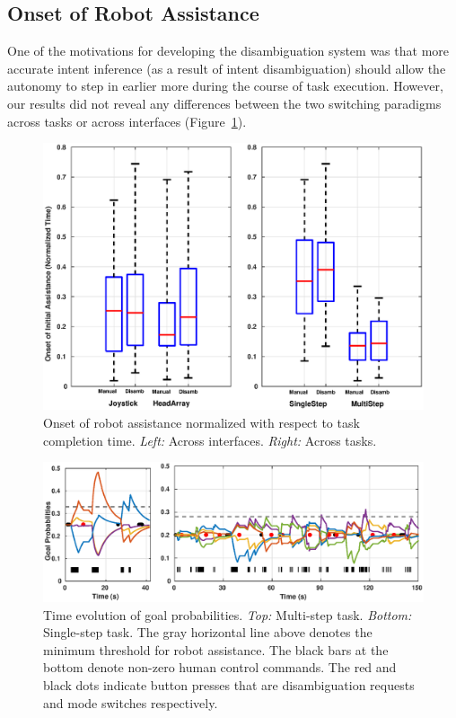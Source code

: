 \documentclass[natbib, twocolumn]{svjour3}          %
\begin{document}
\subsection{Onset of Robot Assistance}\label{ssec:onset}
One of the motivations for developing the disambiguation system was that more accurate intent inference (as a result of intent disambiguation) should allow the autonomy to step in earlier more during the course of task execution. However, our results did not reveal any differences between the two switching paradigms across tasks or across interfaces (Figure~\ref{fig:initial_blend}). 
\begin{figure}[h!]
	\centering
	\includegraphics[width = 1\hsize ,center]{Fig10.eps}
	\caption{Onset of robot assistance normalized with respect to task completion time. \textit{Left:} Across interfaces. \textit{Right:} Across tasks.}
	\label{fig:initial_blend}
\end{figure}

\begin{figure}[ht!]
	\centering
	\includegraphics[width = 0.8\hsize ,center]{Fig11.eps}
	\caption{Time evolution of goal probabilities. \textit{Top:} Multi-step task. \textit{Bottom:} Single-step task. The gray horizontal line above denotes the minimum threshold for robot assistance. The black bars at the bottom denote non-zero human control commands. The red and black dots indicate button presses that are disambiguation requests and mode switches respectively. }
	\label{fig:gp_evolution}
\end{figure}
\end{document}
